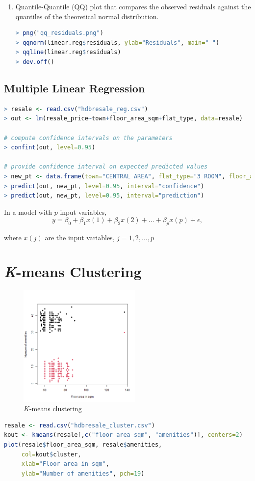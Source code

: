 \documentclass{article}
\begin{document}
\begin{enumerate}
\item Quantile-Quantile (QQ) plot that compares the observed residuals against the quantiles of the theoretical normal distribution.
\begin{lstlisting}[language=R]
> png("qq_residuals.png")
> qqnorm(linear.reg$residuals, ylab="Residuals", main=" ")
> qqline(linear.reg$residuals)
> dev.off()

\end{lstlisting}

\end{enumerate}

\subsection{Multiple Linear Regression}

\begin{lstlisting}[language= R]
> resale <- read.csv("hdbresale_reg.csv")
> out <- lm(resale_price~town+floor_area_sqm+flat_type, data=resale)

# compute confidence intervals on the parameters
> confint(out, level=0.95)

# provide confidence interval on expected predicted values
> new_pt <- data.frame(town="CENTRAL AREA", flat_type="3 ROOM", floor_area_sqm=70)
> predict(out, new_pt, level=0.95, interval="confidence")
> predict(out, new_pt, level=0.95, interval="prediction")
\end{lstlisting}
In a model with $p$ input variables,
$$y = \beta_0 + \beta_1x(1) + \beta_2x(2) + \dots + \beta_px(p) + \epsilon,$$
\begin{center}
    where $x(j)$ are the input variables, $j = 1,2,\dots, p$
\end{center}

\section{\textit{K}-means Clustering}

\begin{figure}[H]
    \centering
    \includegraphics[width=6cm]{images/resale_kmeans.png}
    \caption{$K$-means clustering}
\end{figure}
\begin{lstlisting}[language = R]
resale <- read.csv("hdbresale_cluster.csv")
kout <- kmeans(resale[,c("floor_area_sqm", "amenities")], centers=2)
plot(resale$floor_area_sqm, resale$amenities, 
     col=kout$cluster, 
     xlab="Floor area in sqm", 
     ylab="Number of amenities", pch=19)
\end{lstlisting}
\end{document}
